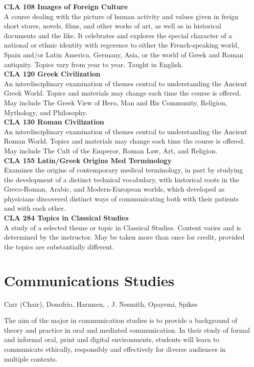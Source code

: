\documentclass[
  letterpaper,
]{scrbook}
\begin{document}
\textbf{CLA 108 Images of Foreign Culture}\\
A course dealing with the picture of human activity and values given in
freign short stores, novels, films, and other works of art, as well as
in historical documents and the like. It celebrates and explores the
special character of a national or ethnic identity with regerence to
either the French-speaking world, Spain and/or Latin America, Germany,
Asia, or the world of Greek and Roman antiquity. Topics vary from year
to year. Taught in English.\\
\textbf{CLA 120 Greek Civilization}\\
An interdisciplinary examination of themes central to understanding the
Ancient Greek World. Topics and materials may change each time the
course is offered. May include The Greek View of Hero, Man and His
Community, Religion, Mythology, and Philosophy.\\
\textbf{CLA 130 Roman Civilization}\\
An interdisciplinary examination of themes central to understanding the
Ancient Roman World. Topics and materials may change each time the
course is offered. May include The Cult of the Emperor, Roman Law, Art,
and Religion.\\
\textbf{CLA 155 Latin/Greek Origins Med Terminology}\\
Examines the origins of contemporary medical terminology, in part by
studying the development of a distinct technical vocabulary, with
historical roots in the Greco-Roman, Arabic, and Modern-European worlds,
which developed as physicians discovered distinct ways of communicating
both with their patients and with each other.\\
\textbf{CLA 284 Topics in Classical Studies}\\
A study of a selected theme or topic in Classical Studies. Content
varies and is determined by the instructor. May be taken more than once
for credit, provided the topics are substantially different.

\section{Communications Studies}\label{sec-communication-studies}

Carr (Chair), Donofrio, Harmsen, , J. Nesmith, Opayemi, Spikes

The aim of the major in communication studies is to provide a background
of theory and practice in oral and mediated communication. In their
study of formal and informal oral, print and digital environments,
students will learn to communicate ethically, responsibly and
effectively for diverse audiences in multiple contexts.
\end{document}
